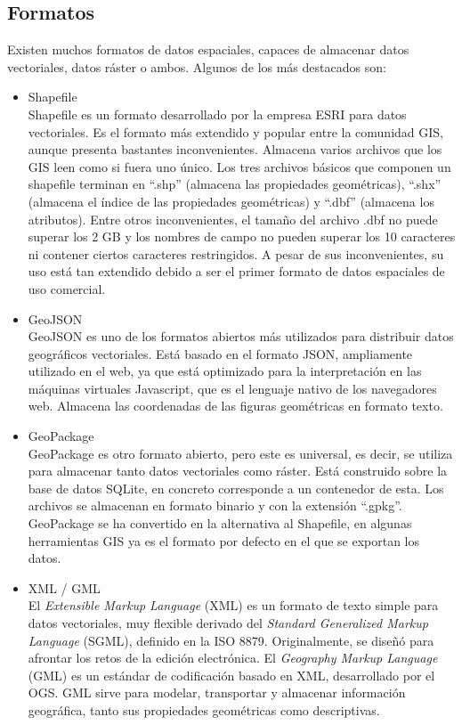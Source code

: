 \subsection{Formatos} \label{sec:formatos}
Existen muchos formatos de datos espaciales, capaces de almacenar datos vectoriales, datos ráster o ambos. Algunos de los más destacados son:
\begin{itemize}
\item Shapefile \\
Shapefile es un formato desarrollado por la empresa ESRI para datos vectoriales. Es el formato más extendido y popular entre la comunidad GIS, aunque presenta bastantes inconvenientes. 
Almacena varios archivos que los GIS leen como si fuera uno único.
Los tres archivos básicos que componen un shapefile terminan en “.shp” (almacena las propiedades geométricas), “.shx” (almacena el índice de las propiedades geométricas) y “.dbf” (almacena los atributos).
Entre otros inconvenientes, el tamaño del archivo .dbf no puede superar los 2 GB y los nombres de campo no pueden superar los 10 caracteres ni contener ciertos caracteres restringidos.
A pesar de sus inconvenientes, su uso está tan extendido debido a ser el primer formato de datos espaciales de uso comercial.

\item GeoJSON \\
GeoJSON es uno de los formatos abiertos más utilizados para distribuir datos geográficos vectoriales. 
Está basado en el formato JSON, ampliamente utilizado en el web, ya que está optimizado para la interpretación en las máquinas virtuales Javascript, que es el lenguaje nativo de los navegadores web.
Almacena las coordenadas de las figuras geométricas en formato texto.

\item GeoPackage \\
GeoPackage es otro formato abierto, pero este es universal, es decir, se utiliza para almacenar tanto datos vectoriales como ráster. 
Está construido sobre la base de datos SQLite, en concreto corresponde a un contenedor de esta. 
Los archivos se almacenan en formato binario y con la extensión “.gpkg”. 
GeoPackage se ha convertido en la alternativa al Shapefile, en algunas herramientas GIS ya es el formato por defecto en el que se exportan los datos. 

\item XML / GML \\
El \textit{Extensible Markup Language} (XML) es un formato de texto simple para datos vectoriales, muy flexible derivado del \textit{Standard Generalized Markup Language} (SGML), definido en la ISO 8879. 
Originalmente, se diseñó para afrontar los retos de la edición electrónica. 
El \textit{Geography Markup Language} (GML) es un estándar de codificación basado en XML, desarrollado por el OGS.
GML sirve para modelar, transportar y almacenar información geográfica, tanto sus propiedades geométricas como descriptivas. 


\end{itemize}
